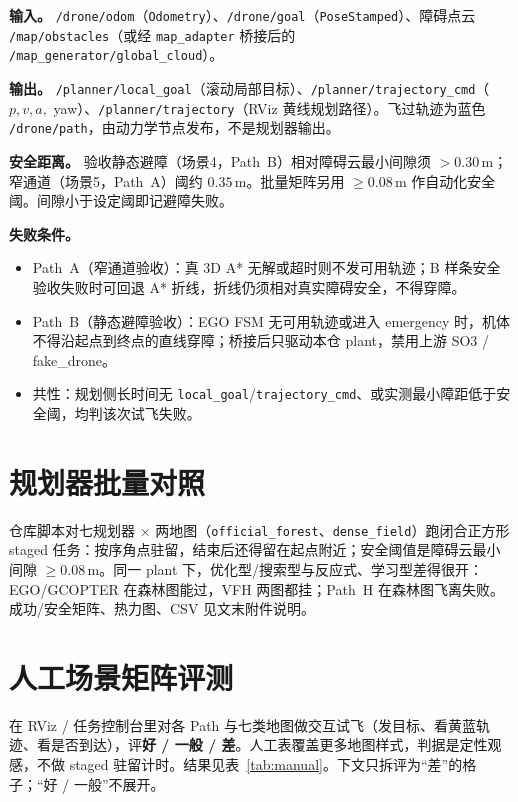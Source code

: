 \noindent\textbf{输入。}
\texttt{/drone/odom}（\texttt{Odometry}）、\texttt{/drone/goal}（\texttt{PoseStamped}）、障碍点云 \texttt{/map/obstacles}（或经 \texttt{map\_adapter} 桥接后的 \texttt{/map\_generator/global\_cloud}）。

\noindent\textbf{输出。}
\texttt{/planner/local\_goal}（滚动局部目标）、\texttt{/planner/trajectory\_cmd}（$p,v,a,$ yaw）、\texttt{/planner/trajectory}（RViz 黄线规划路径）。飞过轨迹为蓝色 \texttt{/drone/path}，由动力学节点发布，不是规划器输出。

\noindent\textbf{安全距离。}
验收静态避障（场景4，Path~B）相对障碍云最小间隙须 $>0.30\,\mathrm{m}$；窄通道（场景5，Path~A）阈约 $0.35\,\mathrm{m}$。批量矩阵另用 $\ge0.08\,\mathrm{m}$ 作自动化安全阈。间隙小于设定阈即记避障失败。

\noindent\textbf{失败条件。}
\begin{itemize}[leftmargin=1.6em,itemsep=0.25em,parsep=0.1em]
  \item Path~A（窄通道验收）：真 3D A* 无解或超时则不发可用轨迹；B 样条安全验收失败时可回退 A* 折线，折线仍须相对真实障碍安全，不得穿障。
  \item Path~B（静态避障验收）：EGO FSM 无可用轨迹或进入 emergency 时，机体不得沿起点到终点的直线穿障；桥接后只驱动本仓 plant，禁用上游 SO3 / fake\_drone。
  \item 共性：规划侧长时间无 \texttt{local\_goal}/\texttt{trajectory\_cmd}、或实测最小障距低于安全阈，均判该次试飞失败。
\end{itemize}

\section{规划器批量对照}

仓库脚本对七规划器 $\times$ 两地图（\texttt{official\_forest}、\texttt{dense\_field}）跑闭合正方形 staged 任务：按序角点驻留，结束后还得留在起点附近；安全阈值是障碍云最小间隙 $\ge0.08\,\mathrm{m}$。同一 plant 下，优化型/搜索型与反应式、学习型差得很开：EGO/GCOPTER 在森林图能过，VFH 两图都挂；Path~H 在森林图飞离失败。成功/安全矩阵、热力图、CSV 见文末附件说明。

\section{人工场景矩阵评测}
\label{sec:manual_matrix}

在 RViz / 任务控制台里对各 Path 与七类地图做交互试飞（发目标、看黄蓝轨迹、看是否到达），评\textbf{好 / 一般 / 差}。人工表覆盖更多地图样式，判据是定性观感，不做 staged 驻留计时。结果见表~\ref{tab:manual}。下文只拆评为“差”的格子；“好 / 一般”不展开。

